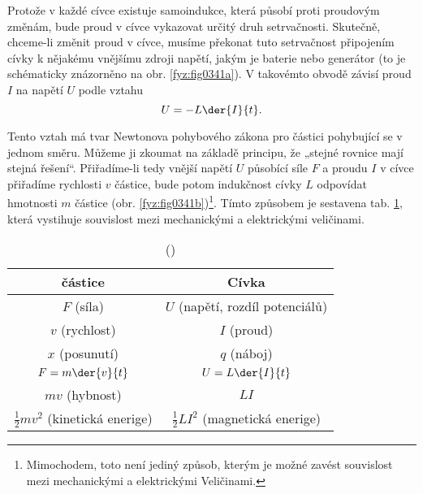   Protože v každé cívce existuje samoindukce, která působí proti proudovým změnám, bude proud v 
  cívce vykazovat určitý druh setrvačnosti. Skutečně, chceme-li změnit proud v cívce, musíme 
  překonat tuto setrvačnost připojením cívky k nějakému vnějšímu zdroji napětí, jakým je baterie 
  nebo generátor (to je schématicky znázorněno na obr. \ref{fyz:fig0341a}). V takovémto obvodě 
  závisí proud \(I\) na napětí \(U\) podle vztahu
  \begin{equation}\label{fyz:eq419}
    U = - L\der{I}{t}.
  \end{equation}
  
  Tento vztah má tvar Newtonova pohybového zákona pro částici pohybující se v jednom směru. Můžeme 
  ji zkoumat na základě principu, že „stejné rovnice mají stejná řešení“. Přiřadíme-li tedy vnější 
  napětí \(U\) působící síle \(F\) a proudu \(I\) v cívce přiřadíme rychlosti \(v\) částice, bude 
  potom indukčnost cívky \(L\) odpovídat hmotnosti \(m\) částice (obr. 
  \ref{fyz:fig0341b})\footnote{Mimochodem, toto není jediný způsob, kterým je možné zavést 
  souvislost mezi mechanickými a elektrickými Veličinami.}. Tímto způsobem je sestavena tab. 
  \ref{fyz:tab009}, která vystihuje souvislost mezi mechanickými a elektrickými veličinami.

  \begin{table}[ht!] %
    \centering
    \renewcommand{\arraystretch}{1.4}
    \begin{tabular}{c|c}
           \hline \textbf{částice}  & \textbf{Cívka}                            \\ \hline
                       \(F\) (síla) & \(U\) (napětí, rozdíl potenciálů)         \\
                \(v\) (rychlost)    & \(I\) (proud)                             \\
                \(x\) (posunutí)    & \(q\) (náboj)                             \\
                \(F = m\der{v}{t}\) & \(U = L\der{I}{t}\)                       \\
                \(mv\) (hybnost)    & \(LI\)                                    \\
       \(\frac{1}{2}mv^2\) (kinetická enerige) & \(\frac{1}{2}LI^2\) (magnetická enerige)     \\
       \hline 
    \end{tabular}
    \caption{(\cite[s.~308]{Feynman01})}
    \label{fyz:tab009}
  \end{table}
    
